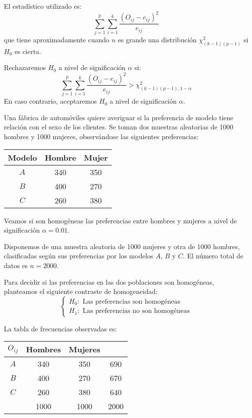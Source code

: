 El estadístico utilizado es:
$$\sum_{j=1}^p \sum_{i=1}^k \frac{(O_{ij}-e_{ij})^2}{e_{ij}}$$
que tiene aproximadamente cuando $n$ es grande una distribución $\chi^2_{(k-1)(p-1)}$ si $H_0$ es cierta.

Rechazaremos $H_0$ a nivel de significación $\alpha$ si:
$$\sum_{j=1}^p \sum_{i=1}^k \frac{(O_{ij}-e_{ij})^2}{e_{ij}} > \chi^2_{(k-1)(p-1), 1-\alpha}$$
En caso contrario, aceptaremos $H_0$ a nivel de significación $\alpha$.

\begin{example}
    Una fábrica de automóviles quiere averiguar si la preferencia de modelo tiene relación con el sexo de los clientes.
    Se toman dos muestras aleatorias de 1000 hombres y 1000 mujeres, observándose las siguientes preferencias:
    \begin{center}
        \begin{tabular}{| c | c c |}
            \hline
            Modelo & Hombre & Mujer \\
            \hline
            $A$    & 340    & 350   \\
            $B$    & 400    & 270   \\
            $C$    & 260    & 380   \\
            \hline
        \end{tabular}
    \end{center}
    Veamos si son homogéneas las preferencias entre hombres y mujeres a nivel de significación $\alpha = 0.01$.

    Disponemos de una muestra aleatoria de 1000 mujeres y otra de 1000 hombres, clasificadas según sus preferencias por los modelos $A$, $B$ y $C$.
    El número total de datos es $n = 2000$.

    Para decidir si las preferencias en las dos poblaciones son homogéneas, planteamos el siguiente contraste de homogeneidad:
    $$\begin{cases}
            H_0: \text{ Las preferencias son homogéneas} \\
            H_1: \text{ Las preferencias no son homogéneas}
        \end{cases}$$

    La tabla de frecuencias observadas es:
    \begin{center}
        \begin{tabular}{| c | c c | c |}
            \hline
            $O_{ij}$ & Hombres & Mujeres &      \\
            \hline
            $A$      & 340     & 350     & 690  \\
            $B$      & 400     & 270     & 670  \\
            $C$      & 260     & 380     & 640  \\
            \hline
                     & 1000    & 1000    & 2000 \\
            \hline
        \end{tabular}
    \end{center}


\end{example}

